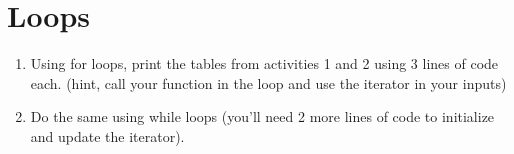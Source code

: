 \documentclass{article}%
\begin{document}
	
	\section*{Loops}
	\begin{enumerate}
		\item Using for loops, print the tables from activities 1 and 2 using 3 lines of code each. (hint, call your function in the loop and use the iterator in your inputs)
		\item Do the same using while loops (you'll need 2 more lines of code to initialize and update the iterator).
	\end{enumerate}
	
\end{document}
